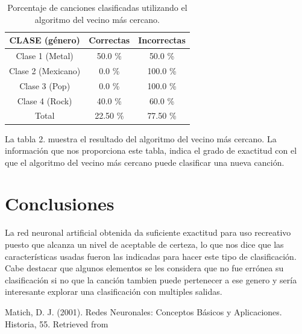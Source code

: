 \documentclass[conference]{IEEEtran}
\begin{document}
\begin{table}[h]
\renewcommand{\arraystretch}{1.3}
\renewcommand{\tablename}{Tabla}
\caption{ Porcentaje de canciones clasificadas utilizando el algoritmo del vecino más cercano. }
\label{table_example}
\centering
\begin{tabular}{|c|c|c|}
\hline
CLASE (género) & Correctas & Incorrectas \\
\hline
Clase 1 (Metal) & 50.0 \% & 50.0 \% \\
\hline
Clase 2 (Mexicano) & 0.0 \% & 100.0 \% \\
\hline
Clase 3 (Pop) & 0.0 \% & 100.0 \% \\
\hline
Clase 4 (Rock) & 40.0 \% & 60.0 \% \\
\hline
Total & 22.50 \% & 77.50 \% \\
\hline
\end{tabular}
\end{table}

La tabla 2. muestra el resultado del algoritmo del vecino más cercano. La información que nos proporciona este tabla, indica el grado de exactitud con el que el algoritmo del vecino más cercano puede clasificar una nueva canción. \\

\section{Conclusiones}
La red neuronal artificial obtenida da suficiente exactitud para uso recreativo puesto que alcanza un nivel de aceptable de certeza, lo que nos dice que las características usadas fueron las indicadas para hacer este tipo de clasificación. Cabe destacar que algunos elementos se les considera que no fue errónea su clasificación si no que la canción tambien puede pertenecer a ese genero y sería interesante explorar una clasificación con multiples salidas. 

\begin{thebibliography}{1}

Matich, D. J. (2001). Redes Neuronales: Conceptos Básicos y Aplicaciones. Historia, 55. Retrieved from %


\end{thebibliography}
\end{document}
